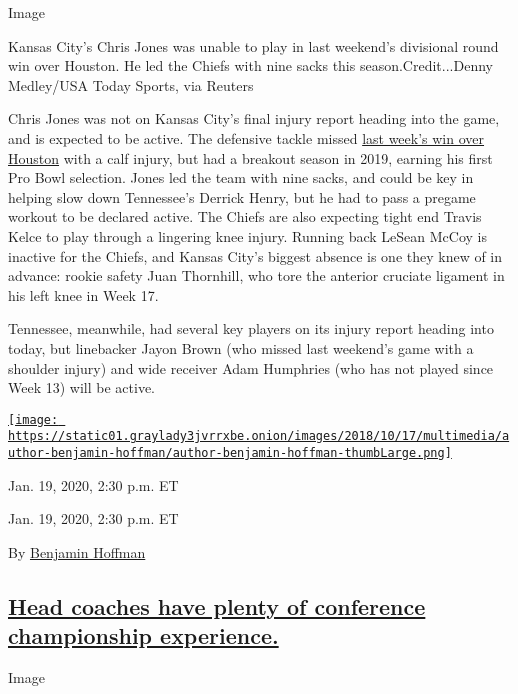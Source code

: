 Image

Kansas City's Chris Jones was unable to play in last weekend's
divisional round win over Houston. He led the Chiefs with nine sacks
this season.Credit...Denny Medley/USA Today Sports, via Reuters

Chris Jones was not on Kansas City's final injury report heading into
the game, and is expected to be active. The defensive tackle missed
\href{https://www.nytimes3xbfgragh.onion/2020/01/12/sports/football/chiefs-texans.html}{last
week's win over Houston} with a calf injury, but had a breakout season
in 2019, earning his first Pro Bowl selection. Jones led the team with
nine sacks, and could be key in helping slow down Tennessee's Derrick
Henry, but he had to pass a pregame workout to be declared active. The
Chiefs are also expecting tight end Travis Kelce to play through a
lingering knee injury. Running back LeSean McCoy is inactive for the
Chiefs, and Kansas City's biggest absence is one they knew of in
advance: rookie safety Juan Thornhill, who tore the anterior cruciate
ligament in his left knee in Week 17.

Tennessee, meanwhile, had several key players on its injury report
heading into today, but linebacker Jayon Brown (who missed last
weekend's game with a shoulder injury) and wide receiver Adam Humphries
(who has not played since Week 13) will be active.

\href{https://www.nytimes3xbfgragh.onion/by/benjamin-hoffman}{\texttt{[image: https://static01.graylady3jvrrxbe.onion/images/2018/10/17/multimedia/author-benjamin-hoffman/author-benjamin-hoffman-thumbLarge.png]}}

Jan. 19, 2020, 2:30 p.m. ET

Jan. 19, 2020, 2:30 p.m. ET

By
\href{https://www.nytimes3xbfgragh.onion/by/benjamin-hoffman}{Benjamin
Hoffman}

\hypertarget{head-coaches-have-plenty-of-conference-championship-experience}{%
\subsection{\texorpdfstring{\protect\hyperlink{head-coaches-have-plenty-of-conference-championship-experience}{Head
coaches have plenty of conference championship
experience.}}{Head coaches have plenty of conference championship experience.}}\label{head-coaches-have-plenty-of-conference-championship-experience}}

Image

